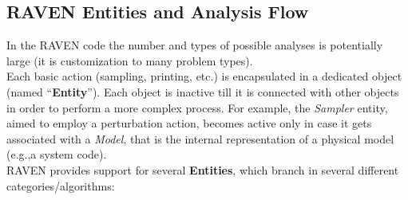 \subsection{RAVEN Entities and Analysis Flow}
\label{sub:EntitiesAndFlow}
In the RAVEN code the number and types of possible analyses is potentially large (it is customization to many problem types).
\\Each basic action (sampling, printing, etc.) is encapsulated in
a dedicated object (named ``\textbf{Entity}''). Each object is inactive till it is connected with
other objects in order to perform a more complex process. For example,
the \textit{Sampler} entity, aimed to employ a perturbation action, becomes active only in case
it gets associated with a \textit{Model}, that is the internal representation of a physical model (e.g.,a system code).
\\RAVEN provides support for several \textbf{Entities}, which branch in several different categories/algorithms:
